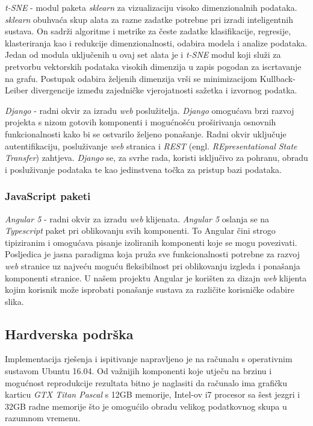 \documentclass[times, utf8, proizvoljni, numeric]{fer}
\begin{document}
\textit{t-SNE}\cite{TSNE} - modul paketa \textit{sklearn} za vizualizaciju visoko dimenzionalnih podataka. \textit{sklearn} obuhvaća skup alata za razne zadatke potrebne pri izradi inteligentnih sustava. On sadrži algoritme i metrike za česte zadatke klasifikacije, regresije, klasteriranja kao i redukcije dimenzionalnosti, odabira modela i analize podataka. Jedan od modula uključenih u ovaj set alata je i \textit{t-SNE} modul koji služi za pretvorbu vektorskih podataka visokih dimenzija u zapis pogodan za iscrtavanje na grafu. Postupak odabira željenih dimenzija vrši se minimizacijom Kullback-Leiber divergencije između zajedničke vjerojatnosti sažetka i izvornog podatka.


\textit{Django} \cite{django}- radni okvir za izradu \textit{web} poslužitelja. \textit{Django} omogućava brzi razvoj projekta s nizom gotovih komponenti i mogućnošću proširivanja osnovnih funkcionalnosti kako bi se ostvarilo željeno ponašanje. Radni okvir uključuje autentifikaciju, posluživanje \textit{web} stranica i \textit{REST} (engl. \textit{REpresentational State Transfer}) zahtjeva. \textit{Django} se, za svrhe rada, koristi isključivo za pohranu, obradu i posluživanje podataka te kao jedinstvena točka za pristup bazi podataka. 


\subsubsection{JavaScript paketi}

\textit{Angular 5} \cite{angular} - radni okvir za izradu \textit{web} klijenata. \textit{Angular 5} oslanja se na \textit{Typescript} paket pri oblikovanju svih komponenti. To Angular čini strogo tipiziranim i omogućava pisanje izoliranih komponenti koje se mogu povezivati. Posljedica je jasna paradigma koja pruža sve funkcionalnosti potrebne za razvoj \textit{web} stranice uz najveću moguću fleksibilnost pri oblikovanju izgleda i ponašanja komponenti stranice. U našem projektu Angular je korišten za dizajn \textit{web} klijenta kojim korisnik može isprobati ponašanje sustava za različite korisničke odabire slika.



\subsection{Hardverska podrška}
Implementacija rješenja i ispitivanje napravljeno je na računalu s operativnim sustavom Ubuntu 16.04. Od važnijih komponenti koje utječu na brzinu i mogućnost reprodukcije rezultata bitno je naglasiti da računalo ima grafičku karticu \textit{GTX Titan Pascal} s 12GB memorije, Intel-ov i7 procesor sa šest jezgri i 32GB radne memorije što je omogućilo obradu velikog podatkovnog skupa u razumnom vremenu.
\end{document}
